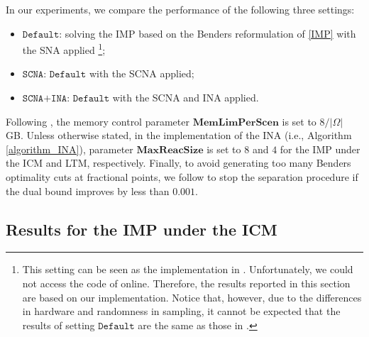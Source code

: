 \documentclass[a4paper,10pt]{article}
\newcommand{\maxlength}{\mathbf{MaxReacSize}}
\theoremstyle{plain}
\newcommand{\Default}{{\texttt{Default}}\xspace}
\newcommand{\SCNA}{{\texttt{SCNA}}\xspace}
\newcommand{\INA}{{\texttt{SCNA+INA}}}
\begin{document}
{	In our experiments, we compare the performance of the following three settings:
	\begin{itemize}
		\item $\Default$: solving the IMP based on the Benders reformulation of \eqref{IMP} with the SNA applied \footnote{This setting can be seen as the implementation in \cite{Guney2020}. Unfortunately, we could not access the code of  \cite{Guney2020} online. Therefore, the results reported in this section are based on our implementation. Notice that, however, due to the differences in hardware and randomness in sampling, it cannot be expected that the  results of setting $\Default$ are the same as those in \cite{Guney2020}.};
		\item $\SCNA$: $\Default$ with the SCNA applied;
		\item $\INA$: $\Default$ with the SCNA and INA applied.
	\end{itemize}
	Following \cite{Guney2020}, the memory control parameter $\mathbf{MemLimPerScen}$ is set to $8/|\Omega|$ GB.
	Unless otherwise stated, in the implementation of the INA (i.e.,  Algorithm \ref{algorithm_INA}), parameter $\maxlength$ is set to $8$ and $4$ for the IMP under the ICM and LTM, respectively.
	Finally, to avoid generating too many Benders optimality cuts at fractional points, we follow \cite{Guney2020} to stop the separation procedure if the dual bound improves by less than $0.001$.
	
	
	
	\subsection{Results for the IMP under the ICM}\label{sect: EICM}
	
	
	
}
\end{document}
